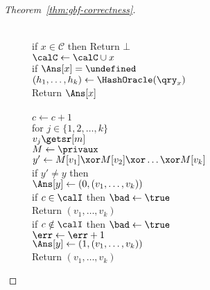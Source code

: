 \begin{proof}[Theorem~\ref{thm:gbf-correctness}]
\begin{figure}[tp]
{{\\
if $x \in \mathcal{C}$ then Return $\bot$\\
$\calC \gets \calC \cup x$\\
if $\Ans[x] = \undefined$\\
\nudge $(h_1, \ldots, h_{k}) \gets \HashOracle(\qry_x)$\\
Return $\Ans[x]$\\
}
{
\\
$c \gets c + 1$\\
for $j \in \{1,2,\ldots,k\}$\\
\nudge $v_j \getsr [m]$\\
%
$M \gets\privaux$\\
$y' \gets M[v_1] \xor M[v_2] \xor \ldots \xor M[v_k]$\\
if $y' \neq y$ then \\
\nudge $\Ans[y] \gets (0, (v_1, \ldots, v_{k}) )$\\
\nudge if $c \in \calI$ then $\bad \gets \true$\\
\nudge Return $\left(v_1,\ldots,v_k\right)$\\
if $c \notin \calI$ then $\bad \gets \true$\\
$\err \gets \err +1$\\
$\Ans[y] \gets (1, (v_1, \ldots, v_{k}))$\\
Return $\left(v_1,\ldots,v_k\right)$
}
}
\end{figure}
\end{proof}
